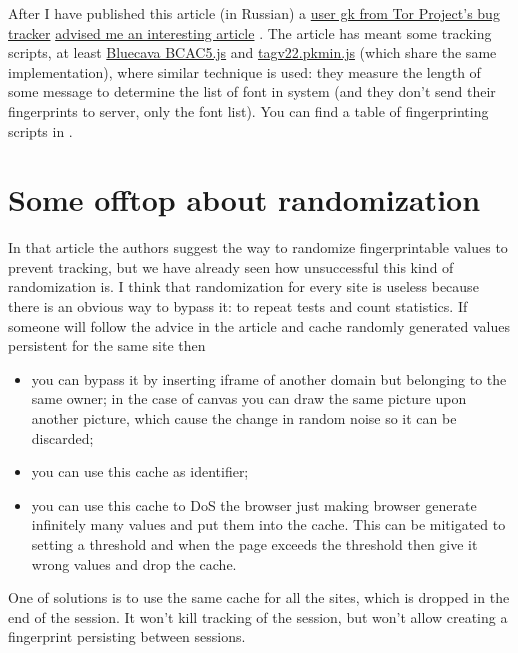 \documentclass[letterpaper,14pt]{article}
\begin{document}
After I have published this article (in Russian) a \href{https://trac.torproject.org/projects/tor/query?reporter=gk}{user gk from  Tor Project's bug tracker} \href{https://trac.torproject.org/projects/tor/ticket/14310\#comment:3}{advised me an interesting article} \cite{Nikiforakis2014}. The article has meant some tracking scripts, at least \href{http://ds.bluecava.com/v50/AC/BCAC5.js}{Bluecava BCAC5.js} and \href{http://tags.master-perf-tools.com/V20test/tagv22.pkmin.js}{tagv22.pkmin.js} (which share the same implementation), where similar technique is used: they measure the length of some message to determine the list of font in system (and they don't send their fingerprints to server, only the font list). You can find a table of fingerprinting scripts in \cite{Acar2013,Acar2014}.

\section{Some offtop about randomization}\label{some-offtop-about-randomization}

In that article the authors suggest the way to randomize fingerprintable values to prevent tracking, but we have already seen how unsuccessful this kind of randomization is. I think that randomization for every site is useless because there is an obvious way to bypass it: to repeat tests and count statistics. If someone will follow the advice in the article and cache randomly generated values persistent for the same site then

\begin{itemize}
\itemsep1pt\parskip0pt
\item
  you can bypass it by inserting iframe of another domain but belonging to the same owner; in the case of canvas you can draw the same picture upon another picture, which cause the change in random noise so it can be discarded;
\item
  you can use this cache as identifier;
\item
  you can use this cache to DoS the browser just making browser generate infinitely many values and put them into the cache. This can be mitigated to setting a threshold and when the page exceeds the threshold then give it wrong values and drop the cache.
\end{itemize}

One of solutions is to use the same cache for all the sites, which is dropped in the end of the session. It won't kill tracking of the session, but won't allow creating a fingerprint persisting between sessions.
\end{document}
